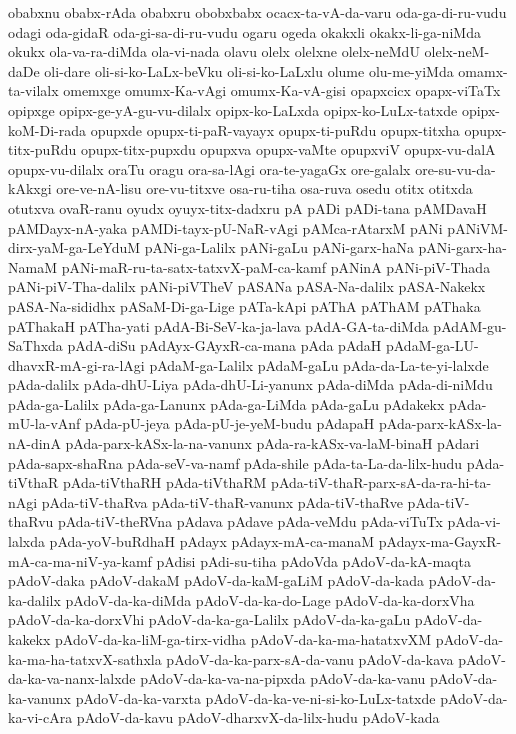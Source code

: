 {obabxnu
obabx-rAda
obabxru
obobxbabx
ocacx-ta-vA-da-varu
oda-ga-di-ru-vudu
odagi
oda-gidaR
oda-gi-sa-di-ru-vudu
ogaru
ogeda
okakxli
okakx-li-ga-niMda
okukx
ola-va-ra-diMda
ola-vi-nada
olavu
olelx
olelxne
olelx-neMdU
olelx-neM-daDe
oli-dare
oli-si-ko-LaLx-beVku
oli-si-ko-LaLxlu
olume
olu-me-yiMda
omamx-ta-vilalx
omemxge
omumx-Ka-vAgi
omumx-Ka-vA-gisi
opapxcicx
opapx-viTaTx
opipxge
opipx-ge-yA-gu-vu-dilalx
opipx-ko-LaLxda
opipx-ko-LuLx-tatxde
opipx-koM-Di-rada
opupxde
opupx-ti-paR-vayayx
opupx-ti-puRdu
opupx-titxha
opupx-titx-puRdu
opupx-titx-pupxdu
opupxva
opupx-vaMte
opupxviV
opupx-vu-dalA
opupx-vu-dilalx
oraTu
oragu
ora-sa-lAgi
ora-te-yagaGx
ore-galalx
ore-su-vu-da-kAkxgi
ore-ve-nA-lisu
ore-vu-titxve
osa-ru-tiha
osa-ruva
osedu
otitx
otitxda
otutxva
ovaR-ranu
oyudx
oyuyx-titx-dadxru
pA
pADi
pADi-tana
pAMDavaH
pAMDayx-nA-yaka
pAMDi-tayx-pU-NaR-vAgi
pAMca-rAtarxM
pANi
pANiVM-dirx-yaM-ga-LeYduM
pANi-ga-Lalilx
pANi-gaLu
pANi-garx-haNa
pANi-garx-ha-NamaM
pANi-maR-ru-ta-satx-tatxvX-paM-ca-kamf
pANinA
pANi-piV-Thada
pANi-piV-Tha-dalilx
pANi-piVTheV
pASANa
pASA-Na-dalilx
pASA-Nakekx
pASA-Na-sididhx
pASaM-Di-ga-Lige
pATa-kApi
pAThA
pAThAM
pAThaka
pAThakaH
pATha-yati
pAdA-Bi-SeV-ka-ja-lava
pAdA-GA-ta-diMda
pAdAM-gu-SaThxda
pAdA-diSu
pAdAyx-GAyxR-ca-mana
pAda
pAdaH
pAdaM-ga-LU-dhavxR-mA-gi-ra-lAgi
pAdaM-ga-Lalilx
pAdaM-gaLu
pAda-da-La-te-yi-lalxde
pAda-dalilx
pAda-dhU-Liya
pAda-dhU-Li-yanunx
pAda-diMda
pAda-di-niMdu
pAda-ga-Lalilx
pAda-ga-Lanunx
pAda-ga-LiMda
pAda-gaLu
pAdakekx
pAda-mU-la-vAnf
pAda-pU-jeya
pAda-pU-je-yeM-budu
pAdapaH
pAda-parx-kASx-la-nA-dinA
pAda-parx-kASx-la-na-vanunx
pAda-ra-kASx-va-laM-binaH
pAdari
pAda-sapx-shaRna
pAda-seV-va-namf
pAda-shile
pAda-ta-La-da-lilx-hudu
pAda-tiVthaR
pAda-tiVthaRH
pAda-tiVthaRM
pAda-tiV-thaR-parx-sA-da-ra-hi-ta-nAgi
pAda-tiV-thaRva
pAda-tiV-thaR-vanunx
pAda-tiV-thaRve
pAda-tiV-thaRvu
pAda-tiV-theRVna
pAdava
pAdave
pAda-veMdu
pAda-viTuTx
pAda-vi-lalxda
pAda-yoV-buRdhaH
pAdayx
pAdayx-mA-ca-manaM
pAdayx-ma-GayxR-mA-ca-ma-niV-ya-kamf
pAdisi
pAdi-su-tiha
pAdoVda
pAdoV-da-kA-maqta
pAdoV-daka
pAdoV-dakaM
pAdoV-da-kaM-gaLiM
pAdoV-da-kada
pAdoV-da-ka-dalilx
pAdoV-da-ka-diMda
pAdoV-da-ka-do-Lage
pAdoV-da-ka-dorxVha
pAdoV-da-ka-dorxVhi
pAdoV-da-ka-ga-Lalilx
pAdoV-da-ka-gaLu
pAdoV-da-kakekx
pAdoV-da-ka-liM-ga-tirx-vidha
pAdoV-da-ka-ma-hatatxvXM
pAdoV-da-ka-ma-ha-tatxvX-sathxla
pAdoV-da-ka-parx-sA-da-vanu
pAdoV-da-kava
pAdoV-da-ka-va-nanx-lalxde
pAdoV-da-ka-va-na-pipxda
pAdoV-da-ka-vanu
pAdoV-da-ka-vanunx
pAdoV-da-ka-varxta
pAdoV-da-ka-ve-ni-si-ko-LuLx-tatxde
pAdoV-da-ka-vi-cAra
pAdoV-da-kavu
pAdoV-dharxvX-da-lilx-hudu
pAdoV-kada
}
